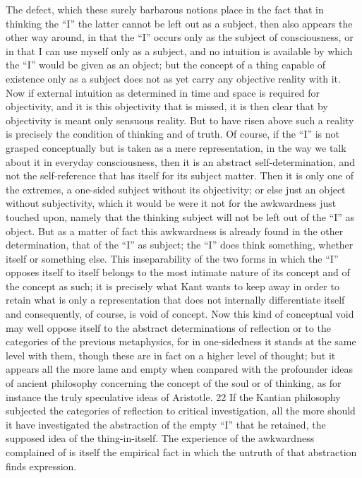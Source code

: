 The defect, which these surely barbarous notions place in the fact that
in thinking the “I” the latter cannot be left out as a subject, then also
appears the other way around, in that the “I” occurs only as the subject of
consciousness, or in that I can use myself only as a subject, and no intuition
is available by which the “I” would be given as an object; but the concept
of a thing capable of existence only as a subject does not as yet carry any
objective reality with it.
 Now if external intuition as determined in time
and space is required for objectivity, and it is this objectivity that is missed,
it is then clear that by objectivity is meant only sensuous reality. But to
have risen above such a reality is precisely the condition of thinking and of
truth. Of course, if the “I” is not grasped conceptually but is taken as a mere
representation, in the way we talk about it in everyday consciousness, then
it is an abstract self-determination, and not the self-reference that has itself
for its subject matter. Then it is only one of the extremes, a one-sided subject
without its objectivity; or else just an object without subjectivity, which it
would be were it not for the awkwardness just touched upon, namely that
the thinking subject will not be left out of the “I” as object. But as a matter
of fact this awkwardness is already found in the other determination, that of
the “I” as subject; the “I” does think something, whether itself or something
else. This inseparability of the two forms in which the “I” opposes itself to
itself belongs to the most intimate nature of its concept and of the concept
as such; it is precisely what Kant wants to keep away in order to retain
what is only a representation that does not internally differentiate itself and
consequently, of course, is void of concept. Now this kind of conceptual
void may well oppose itself to the abstract determinations of reflection or
to the categories of the previous metaphysics, for in one-sidedness it stands
at the same level with them, though these are in fact on a higher level of
thought; but it appears all the more lame and empty when compared with
the profounder ideas of ancient philosophy concerning the concept of the
soul or of thinking, as for instance the truly speculative ideas of Aristotle. 22
If the Kantian philosophy subjected the categories of reflection to critical
investigation, all the more should it have investigated the abstraction of the
empty “I” that he retained, the supposed idea of the thing-in-itself. The
experience of the awkwardness complained of is itself the empirical fact in
which the untruth of that abstraction finds expression.

